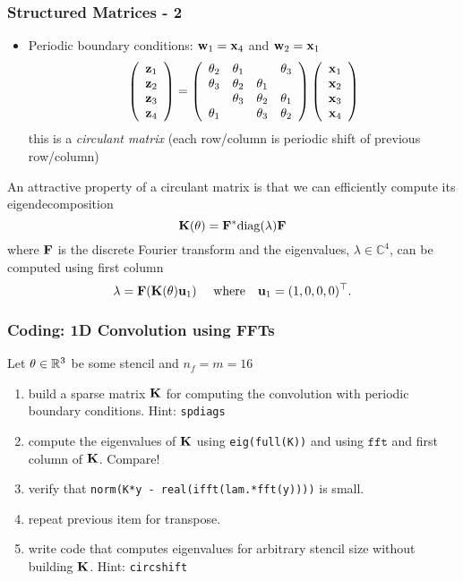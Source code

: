 \documentclass[12pt,fleqn,handout]{beamer}
\begin{document}
\begin{frame}
	\frametitle{Structured Matrices - 2}
	\begin{itemize}
		\item Periodic boundary conditions: ${\bf w}_1 = {\bf x}_4$ and ${\bf w}_2 = {\bf x}_1$
	$$
		\left( 
		\begin{array}{r}
			{\bf z}_1\\
			{\bf z}_2\\
			{\bf z}_3\\
			{\bf z}_4
		\end{array}
		\right)
		=
		\left( 
		\begin{array}{rrrr}
			        \theta_2 & \theta_1 &          & \theta_3  \\
			        \theta_3 & \theta_2 & \theta_1 &           \\
			                 & \theta_3 & \theta_2 & \theta_1  \\
			        \theta_1 &          & \theta_3 & \theta_2  \\
		\end{array}
		\right)
		\left( 
		\begin{array}{r}
			{\bf x}_1\\
			{\bf x}_2\\
			{\bf x}_3\\
			{\bf x}_4\\
		\end{array}
		\right)
	$$
	this is a \emph{circulant matrix} (each row/column is periodic shift of previous row/column)
	\end{itemize}
	\pause
	
	An attractive property of a circulant matrix is that we can efficiently compute its eigendecomposition
	$$
		{\bf K}(\theta) = {\bf F}^* {\rm diag}(\lambda) {\bf F}
	$$ 
	where ${\bf F}$ is the discrete Fourier transform and the eigenvalues, $\lambda \in {\mathbb{C}}^4$, can be computed using first column
	$$
		\lambda =   {\bf F}( {\bf K}(\theta) {\bf u}_1) \quad \text{ where} \quad {\bf u}_1 = (1,0,0,0)^\top.
	$$ 	
\end{frame}

\begin{frame}\frametitle{Coding: 1D Convolution using FFTs}
	Let $\theta \in \mathbb{R}^3$ be some stencil and $n_f = m = 16$ 
\begin{enumerate}
	\item build a sparse matrix ${\bf K}$ for computing the convolution with periodic boundary conditions. 
	Hint: \texttt{spdiags}
	
	\item compute the eigenvalues of ${\bf K}$ using \texttt{eig(full(K))} and using $\texttt{fft}$ and first column of ${\bf K}$. Compare!
	
	\item verify that \texttt{norm(K*y - real(ifft(lam.*fft(y))))} is small.
	
	\item repeat previous item for transpose.
	
	\item write code that computes eigenvalues for arbitrary stencil size without building ${\bf K}$. Hint: \texttt{circshift}
\end{enumerate}
\end{frame}
\end{document}
